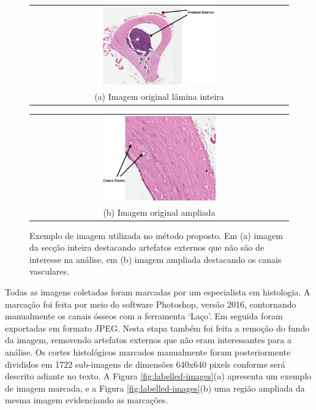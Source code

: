 \begin{figure}[h]
    \center
    \begin{tabular}{@{}c@{}}
        \includegraphics[width=0.45\textwidth]{figures/3_methods/imagem_original_inteira.png}
        \\[\abovecaptionskip]
    \small (a) Imagem original lâmina inteira
    \end{tabular}
    \begin{tabular}{@{}c@{}}
        \includegraphics[width=0.45\textwidth]{figures/3_methods/imagem_original_ampliada.png}
        \\[\abovecaptionskip]
    \small (b) Imagem original ampliada
    \end{tabular}
    
    \caption[Exemplo de imagem utilizada no método proposto.]{Exemplo de imagem utilizada no método proposto. Em (a) imagem da secção inteira destacando artefatos externos que não são de interesse na análise, em (b) imagem ampliada destacando os canais vasculares.} 
    \label{fig:original-images}
\end{figure}

Todas as imagens coletadas foram marcadas por um especialista em histologia. A marcação foi feita por meio do software Photoshop\textregistered, versão 2016, contornando manualmente os canais ósseos com a ferramenta `Laço'. Em seguida foram exportadas em formato JPEG. Nesta etapa também foi feita a remoção do fundo da imagem, removendo artefatos externos que não eram interessantes para a análise. Os cortes histológicos marcados manualmente foram posteriormente divididos em 1722 sub-imagens de dimensões 640x640 pixels conforme será descrito adiante no texto.
A Figura \ref{fig:labelled-images}(a) apresenta um exemplo de imagem marcada, e a Figura \ref{fig:labelled-images}(b) uma região ampliada da mesma imagem evidenciando as marcações. 

